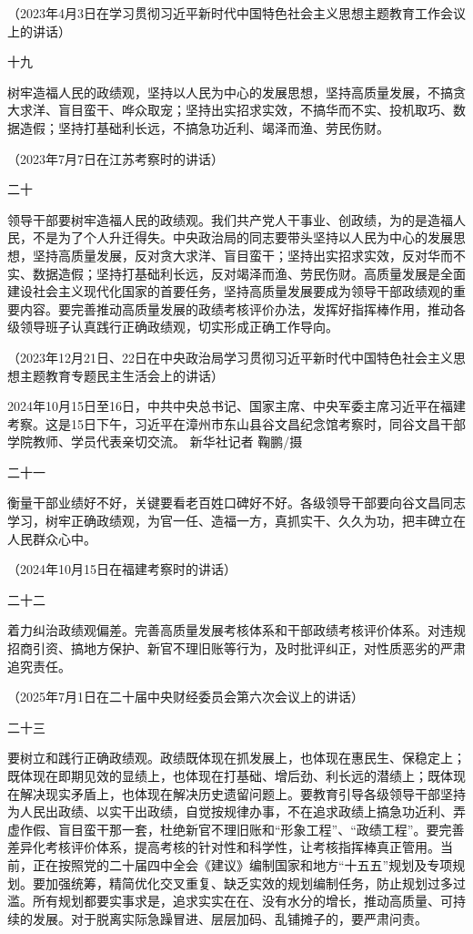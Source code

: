 \documentclass[UTF8,zihao=-4]{ctexart}
\begin{document}
（2023年4月3日在学习贯彻习近平新时代中国特色社会主义思想主题教育工作会议上的讲话）

十九

树牢造福人民的政绩观，坚持以人民为中心的发展思想，坚持高质量发展，不搞贪大求洋、盲目蛮干、哗众取宠；坚持出实招求实效，不搞华而不实、投机取巧、数据造假；坚持打基础利长远，不搞急功近利、竭泽而渔、劳民伤财。

（2023年7月7日在江苏考察时的讲话）

二十

领导干部要树牢造福人民的政绩观。我们共产党人干事业、创政绩，为的是造福人民，不是为了个人升迁得失。中央政治局的同志要带头坚持以人民为中心的发展思想，坚持高质量发展，反对贪大求洋、盲目蛮干；坚持出实招求实效，反对华而不实、数据造假；坚持打基础利长远，反对竭泽而渔、劳民伤财。高质量发展是全面建设社会主义现代化国家的首要任务，坚持高质量发展要成为领导干部政绩观的重要内容。要完善推动高质量发展的政绩考核评价办法，发挥好指挥棒作用，推动各级领导班子认真践行正确政绩观，切实形成正确工作导向。

（2023年12月21日、22日在中央政治局学习贯彻习近平新时代中国特色社会主义思想主题教育专题民主生活会上的讲话）

2024年10月15日至16日，中共中央总书记、国家主席、中央军委主席习近平在福建考察。这是15日下午，习近平在漳州市东山县谷文昌纪念馆考察时，同谷文昌干部学院教师、学员代表亲切交流。 新华社记者 鞠鹏/摄

二十一

衡量干部业绩好不好，关键要看老百姓口碑好不好。各级领导干部要向谷文昌同志学习，树牢正确政绩观，为官一任、造福一方，真抓实干、久久为功，把丰碑立在人民群众心中。

（2024年10月15日在福建考察时的讲话）

二十二

着力纠治政绩观偏差。完善高质量发展考核体系和干部政绩考核评价体系。对违规招商引资、搞地方保护、新官不理旧账等行为，及时批评纠正，对性质恶劣的严肃追究责任。

（2025年7月1日在二十届中央财经委员会第六次会议上的讲话）

二十三

要树立和践行正确政绩观。政绩既体现在抓发展上，也体现在惠民生、保稳定上；既体现在即期见效的显绩上，也体现在打基础、增后劲、利长远的潜绩上；既体现在解决现实矛盾上，也体现在解决历史遗留问题上。要教育引导各级领导干部坚持为人民出政绩、以实干出政绩，自觉按规律办事，不在追求政绩上搞急功近利、弄虚作假、盲目蛮干那一套，杜绝新官不理旧账和“形象工程”、“政绩工程”。要完善差异化考核评价体系，提高考核的针对性和科学性，让考核指挥棒真正管用。当前，正在按照党的二十届四中全会《建议》编制国家和地方“十五五”规划及专项规划。要加强统筹，精简优化交叉重复、缺乏实效的规划编制任务，防止规划过多过滥。所有规划都要实事求是，追求实实在在、没有水分的增长，推动高质量、可持续的发展。对于脱离实际急躁冒进、层层加码、乱铺摊子的，要严肃问责。
\end{document}
